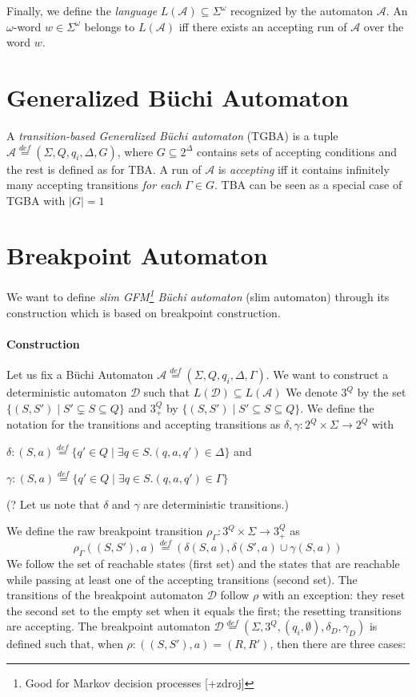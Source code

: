\documentclass[
	digital
nolof, nolot
]{fithesis3}
\newcommand{\cA}{\mathcal{A}}
\newcommand{\cD}{\mathcal{D}}
\newcommand{\lA}{L(\cA)}
\newcommand{\lD}{L(\cD)}
\newcommand{\eqdef}{\overset{def}{=}}
\begin{document}
			Finally, we define the \emph{language} $\lA \subseteq \Sigma^\omega$ recognized by the automaton $\cA$. An $\omega$-word $w \in \Sigma^\omega$ belongs to $\lA$ iff there exists an accepting run of $\cA$ over the word $w$. 
			
		\section{Generalized Büchi Automaton}
		A \emph{transition-based Generalized Büchi automaton} (TGBA) is a tuple $\cA\eqdef(\Sigma, Q, q_i, \Delta, G)$, where $G \subseteq 2^\Delta$ contains sets of accepting conditions and the rest is defined as for TBA. A run of $\cA$ is \emph{accepting} iff it contains infinitely many accepting transitions \emph{for each} $\Gamma \in G$. TBA can be seen as a special case of TGBA with $|G|=1$
		
		\section{Breakpoint Automaton}
			We want to define \emph{slim GFM\footnote{Good for Markov decision processes [+zdroj]} Büchi automaton} (slim automaton) through its construction which is based on breakpoint construction. 
			\paragraph{Construction}
			Let us fix a Büchi Automaton $\cA\eqdef(\Sigma, Q, q_i, \Delta, \Gamma)$. 
			We want to construct a deterministic automaton $\cD$ such that $\lD\subseteq \lA$ 
			We denote $3^Q$ by the set $\{(S,S') \mid S'\subsetneq S \subseteq Q\}$ and
			$3^Q_+$ by $\{(S,S') \mid S'\subseteq S \subseteq Q\}$.
			We define the notation for the transitions and accepting transitions as $\delta,\gamma:2^Q \times \Sigma \rightarrow 2^Q$ with
			
			$\delta: (S,a)\eqdef\{q'\in Q \mid \exists q \in S.(q,a,q') \in \Delta\}$ and
			
			$\gamma: (S,a)\eqdef\{q'\in Q \mid \exists q \in S.(q,a,q') \in \Gamma\}$
			
			(? Let us note that $\delta$ and $\gamma$ are deterministic transitions.)
			
			We define the raw breakpoint transition
			$\rho_\Gamma \colon 3^Q \times \Sigma \rightarrow 3^Q_+$ as
			\[\rho_\Gamma((S, S'), a) \eqdef(\delta(S, a), \delta(S',a)\cup \gamma(S, a))\]
			We follow the set of reachable states (first set) and the states that are reachable while passing at least one of the accepting transitions (second set).
			The transitions of the breakpoint automaton $\cD$ follow $\rho$ with an exception: they reset the second set to the empty set when it equals the first; the resetting transitions are accepting.
			The breakpoint automaton $\cD \eqdef (\Sigma, 3^Q, (q_i, \emptyset), \delta_D, \gamma_D)$ is defined such that, when $\rho\colon ((S, S'), a) = (R, R')$, then there are three cases:
			
\end{document}
